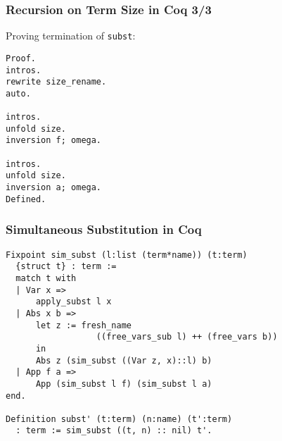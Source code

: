 \documentclass[notheorems]{beamer}
\begin{document}
\begin{frame}[fragile]

  \frametitle{Recursion on Term Size in Coq 3/3}

  Proving termination of \texttt{subst}:
  \begin{lstlisting}
Proof.
intros.
rewrite size_rename.
auto.

intros.
unfold size.
inversion f; omega.

intros.
unfold size.
inversion a; omega.
Defined.
  \end{lstlisting}

\end{frame}




\begin{frame}[fragile]

  \frametitle{Simultaneous Substitution in Coq}

  \begin{lstlisting}
Fixpoint sim_subst (l:list (term*name)) (t:term)
  {struct t} : term :=
  match t with
  | Var x =>
      apply_subst l x
  | Abs x b =>
      let z := fresh_name
                  ((free_vars_sub l) ++ (free_vars b))
      in
      Abs z (sim_subst ((Var z, x)::l) b)
  | App f a =>
      App (sim_subst l f) (sim_subst l a)
end.

Definition subst' (t:term) (n:name) (t':term)
  : term := sim_subst ((t, n) :: nil) t'.
  \end{lstlisting}

\end{frame}
\end{document}
